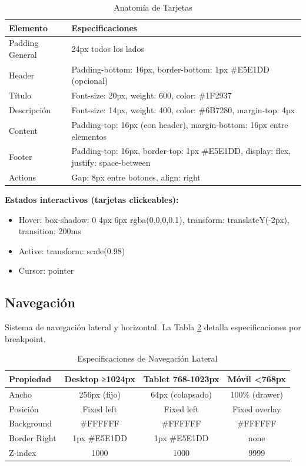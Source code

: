 \documentclass[12pt,a4paper,oneside]{article}
\begin{document}
\begin{table}[h]
\centering
\caption{Anatomía de Tarjetas}
\label{tab:cards-anatomia}
\small
\begin{tabular}{|l|p{9cm}|}
\hline
\textbf{Elemento} & \textbf{Especificaciones} \\
\hline
Padding General & 24px todos los lados \\
\hline
Header & Padding-bottom: 16px, border-bottom: 1px \#E5E1DD (opcional) \\
\hline
Título & Font-size: 20px, weight: 600, color: \#1F2937 \\
\hline
Descripción & Font-size: 14px, weight: 400, color: \#6B7280, margin-top: 4px \\
\hline
Content & Padding-top: 16px (con header), margin-bottom: 16px entre elementos \\
\hline
Footer & Padding-top: 16px, border-top: 1px \#E5E1DD, display: flex, justify: space-between \\
\hline
Actions & Gap: 8px entre botones, align: right \\
\hline
\end{tabular}
\end{table}

\textbf{Estados interactivos (tarjetas clickeables):}
\begin{itemize}
    \item Hover: box-shadow: 0 4px 6px rgba(0,0,0,0.1), transform: translateY(-2px), transition: 200ms
    \item Active: transform: scale(0.98)
    \item Cursor: pointer
\end{itemize}

\subsection{Navegación}

Sistema de navegación lateral y horizontal. La Tabla \ref{tab:nav-specs} detalla especificaciones por breakpoint.

\begin{table}[h]
\centering
\caption{Especificaciones de Navegación Lateral}
\label{tab:nav-specs}
\small
\begin{tabular}{|l|c|c|c|}
\hline
\textbf{Propiedad} & \textbf{Desktop ≥1024px} & \textbf{Tablet 768-1023px} & \textbf{Móvil <768px} \\
\hline
Ancho & 256px (fijo) & 64px (colapsado) & 100\% (drawer) \\
\hline
Posición & Fixed left & Fixed left & Fixed overlay \\
\hline
Background & \#FFFFFF & \#FFFFFF & \#FFFFFF \\
\hline
Border Right & 1px \#E5E1DD & 1px \#E5E1DD & none \\
\hline
Z-index & 1000 & 1000 & 9999 \\
\hline
\end{tabular}
\end{table}
\end{document}
